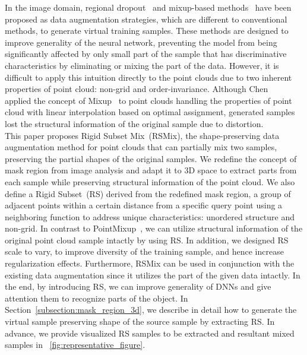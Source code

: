 \documentclass[final]{cvpr}
\begin{document}
\indent In the image domain, regional dropout~\cite{zhong2020random,singh2017hide,ghiasi2018dropblock,devries2017improved} and mixup-based methods~\cite{zhang2017mixup,verma2019manifold,yun2019cutmix,kim2020puzzle,harris2020fmix} have been proposed as data augmentation strategies, which are different to conventional methods, to generate virtual training samples. These methods are designed to improve generality of the neural network, preventing the model from being significantly affected by only small part of the sample that has discriminative characteristics by eliminating or mixing the part of the data. However, it is difficult to apply this intuition directly to the point clouds due to two inherent properties of point cloud: non-grid and order-invariance. Although Chen~\etal~\cite{chen2020pointmixup} applied the concept of Mixup~\cite{zhang2017mixup} to point clouds handling the properties of point cloud with linear interpolation based on optimal assignment, generated samples lost the structural information of the original sample due to distortion.\\
\indent This paper proposes Rigid Subset Mix~(RSMix), the shape-preserving data augmentation method for point clouds that can partially mix two samples, preserving the partial shapes of the original samples. We redefine the concept of mask region from image analysis and adapt it to 3D space to extract parts from each sample while preserving structural information of the point cloud. We also define a Rigid Subset~(RS) derived from the redefined mask region, a group of adjacent points within a certain distance from a specific query point using a neighboring function to address unique characteristics: unordered structure and non-grid. In contrast to PointMixup~\cite{chen2020pointmixup}, we can utilize structural information of the original point cloud sample intactly by using RS. In addition, we designed RS scale to vary, to improve diversity of the training sample, and hence increase regularization effects. Furthermore, RSMix can be used in conjunction with the existing data augmentation since it utilizes the part of the given data intactly. In the end, by introducing RS, we can improve generality of DNNs and give attention them to recognize parts of the object. In Section~\ref{subsection:mask_region_3d}, we describe in detail how to generate the virtual sample preserving shape of the source sample by extracting RS. In advance, we provide visualized RS samples to be extracted and resultant mixed samples in \figurename~\ref{fig:representative_figure}. \\
\end{document}

